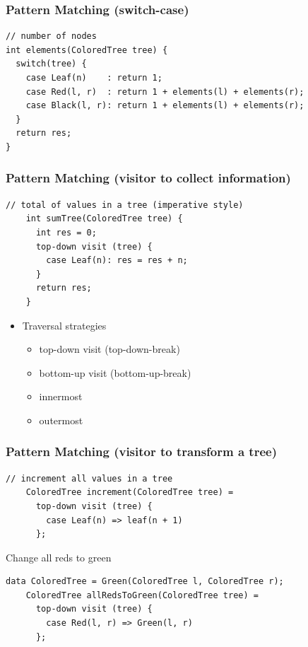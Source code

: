 \documentclass{beamer}
\begin{document}
\begin{frame}[fragile]
  \frametitle{Pattern Matching (switch-case)}

    \begin{small}
      \begin{lstlisting}[language=Rascal]
// number of nodes  
int elements(ColoredTree tree) {
  switch(tree) {
    case Leaf(n)    : return 1; 
    case Red(l, r)  : return 1 + elements(l) + elements(r);
    case Black(l, r): return 1 + elements(l) + elements(r);
  }
  return res; 
} 
\end{lstlisting}
    \end{small}

  
\end{frame}

\begin{frame}[fragile]
  \frametitle{Pattern Matching (visitor to collect information)}

    \begin{small}
      \begin{lstlisting}[language=Rascal]
    // total of values in a tree (imperative style)     
    int sumTree(ColoredTree tree) {
      int res = 0;
      top-down visit (tree) {
        case Leaf(n): res = res + n;
      }
      return res;
    }
\end{lstlisting}
\end{small}

  \begin{itemize}
    \item Traversal strategies
      \begin{itemize}
        \item top-down visit (top-down-break)
        \item bottom-up visit (bottom-up-break)
        \item innermost
        \item outermost  
      \end{itemize}  
  \end{itemize}  
\end{frame}

\begin{frame}[fragile]
  \frametitle{Pattern Matching (visitor to transform a tree)}

  \begin{lstlisting}[language=Rascal]
    // increment all values in a tree 
    ColoredTree increment(ColoredTree tree) =
      top-down visit (tree) {
        case Leaf(n) => leaf(n + 1)
      };
    \end{lstlisting}  
  \pause

  \begin{block}{Change all reds to green}
    \begin{lstlisting}[language=Rascal]
    data ColoredTree = Green(ColoredTree l, ColoredTree r);   
    ColoredTree allRedsToGreen(ColoredTree tree) =
      top-down visit (tree) {
        case Red(l, r) => Green(l, r)
      };
    \end{lstlisting}  
  \end{block}
\end{frame}
\end{document}
